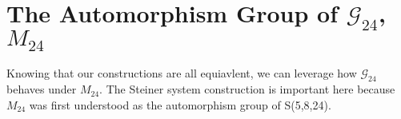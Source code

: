 \documentclass[paper=a4, fontsize=11pt]{scrartcl} %
\numberwithin{equation}{section} %
\numberwithin{figure}{section} %
\numberwithin{table}{section} %
\theoremstyle{break}
\begin{document}
\section{The Automorphism Group of $\mathcal{G}_{24}$, $M_{24}$}
Knowing that our constructions are all equiavlent, we can leverage how $\mathcal{G}_{24}$ behaves under $M_{24}$. The Steiner system construction is important here because $M_{24}$ was first understood as the automorphism group of S(5,8,24).

\clearpage
\printbibliography
\end{document}
